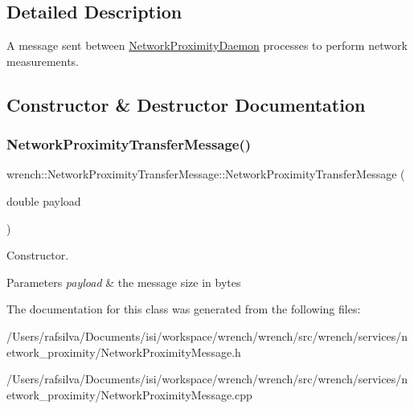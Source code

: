 \subsection{Detailed Description}
A message sent between \hyperlink{classwrench_1_1_network_proximity_daemon}{Network\+Proximity\+Daemon} processes to perform network measurements. 

\subsection{Constructor \& Destructor Documentation}
\mbox{\label{classwrench_1_1_network_proximity_transfer_message_aca8f39006124db8bf6c06a7f27873ae0}} 
\subsubsection{\texorpdfstring{Network\+Proximity\+Transfer\+Message()}{NetworkProximityTransferMessage()}}
{\footnotesize\ttfamily wrench\+::\+Network\+Proximity\+Transfer\+Message\+::\+Network\+Proximity\+Transfer\+Message (\begin{DoxyParamCaption}\item[{double}]{payload }\end{DoxyParamCaption})}



Constructor. 


\begin{DoxyParams}{Parameters}
{\em payload} & the message size in bytes \\
\hline
\end{DoxyParams}


The documentation for this class was generated from the following files\+:\begin{DoxyCompactItemize}
\item 
/\+Users/rafsilva/\+Documents/isi/workspace/wrench/wrench/src/wrench/services/network\+\_\+proximity/Network\+Proximity\+Message.\+h\item 
/\+Users/rafsilva/\+Documents/isi/workspace/wrench/wrench/src/wrench/services/network\+\_\+proximity/Network\+Proximity\+Message.\+cpp\end{DoxyCompactItemize}
